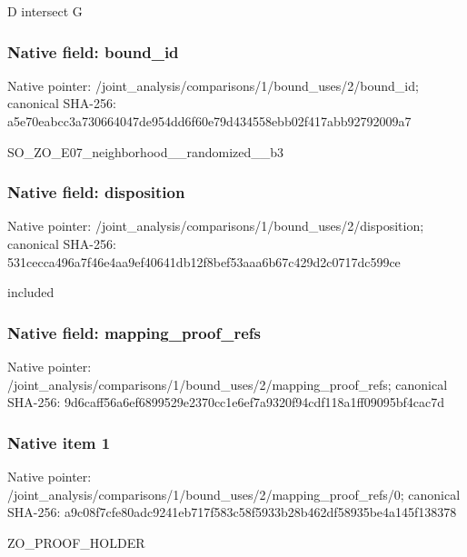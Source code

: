 \documentclass[10pt,a4paper]{article}
\begin{document}
\begingroup\raggedright\sloppy D intersect G\par\endgroup

\subsubsection{Native field: bound\_\allowbreak{}id}
Native pointer: /joint\_\allowbreak{}analysis/comparisons/1/bound\_\allowbreak{}uses/2/bound\_\allowbreak{}id; canonical SHA-256: a5e70eabcc3a730664047de954dd6f60e79d434558ebb02f417abb92792009a7

\begingroup\raggedright\sloppy SO\_\allowbreak{}ZO\_\allowbreak{}E07\_\allowbreak{}neighborhood\_\allowbreak{}\_\allowbreak{}randomized\_\allowbreak{}\_\allowbreak{}b3\par\endgroup

\subsubsection{Native field: disposition}
Native pointer: /joint\_\allowbreak{}analysis/comparisons/1/bound\_\allowbreak{}uses/2/disposition; canonical SHA-256: 531cecca496a7f46e4aa9ef40641db12f8bef53aaa6b67c429d2c0717dc599ce

\begingroup\raggedright\sloppy included\par\endgroup

\subsubsection{Native field: mapping\_\allowbreak{}proof\_\allowbreak{}refs}
Native pointer: /joint\_\allowbreak{}analysis/comparisons/1/bound\_\allowbreak{}uses/2/mapping\_\allowbreak{}proof\_\allowbreak{}refs; canonical SHA-256: 9d6caff56a6ef6899529e2370cc1e6ef7a9320f94cdf118a1ff09095bf4cac7d

\subsubsection{Native item 1}
Native pointer: /joint\_\allowbreak{}analysis/comparisons/1/bound\_\allowbreak{}uses/2/mapping\_\allowbreak{}proof\_\allowbreak{}refs/0; canonical SHA-256: a9c08f7cfe80adc9241eb717f583c58f5933b28b462df58935be4a145f138378

\begingroup\raggedright\sloppy ZO\_\allowbreak{}PROOF\_\allowbreak{}HOLDER\par\endgroup
\end{document}
